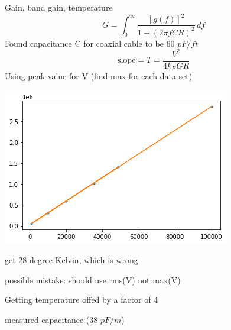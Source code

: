 \documentclass[a4paper]{tufte-handout}
\begin{document}
Gain, band gain, temperature
$$G=\int_{0}^{\infty} \frac{[g(f)]^2}{1+(2\pi fCR)^2} \,df$$
Found capacitance C for coaxial cable to be 60 $pF/ft$
$$\text{slope} = T = \frac{V^2}{4k_BGR}$$
Using peak value for V (find max for each data set)

\includegraphics[width = 1 \textwidth]{figures/day2_room.png}

get 28 degree Kelvin, which is wrong

possible mistake: should use rms(V) not max(V)

\hrulefill

Getting temperature offed by a factor of 4

measured capacitance (38 $pF/m$)
\end{document}
